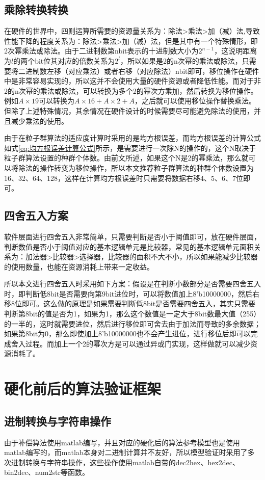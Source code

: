 \subsection{乘除转换转换}
在硬件的世界中，四则运算所需要的资源量关系为：除法>乘法>加（减）法,导致性能下降的程度关系为：除法>乘法>加（减）法，但是其中有一个特殊情形，即2次幂乘法或除法。由于二进制数第nbit表示的十进制数大小为$2^{n-1}$，这说明距离为$l$的两个bit位其对应的倍数关系为$2^{l}$，所以如果是2的n次幂的乘法或除法，只需要将二进制数左移（对应乘法）或者右移（对应除法）nbit即可，移位操作在硬件中是非常容易实现的，所以这并不会使用大量的硬件资源或者降低性能。而对于非2的n次幂的乘法或除法，可以转换为多个2的幂次方乘加，然后转换为移位操作。例如$A\times 19$可以转换为$A\times 16 +A\times 2+A$，之后就可以使用移位操作替换乘法。但除了上述特殊情况，其余情况在硬件设计的时候需要尽可能避免除法的使用，并且减少乘法的使用。

由于在粒子群算法的适应度计算时采用的是均方根误差，而均方根误差的计算公式如式\eqref{eq:均方根误差计算公式}所示，是需要进行一次除N的操作的，这个N取决于粒子群算法设置的种群个体数。由前文所述，如果这个N是2的幂乘法，那么就可以将除法的操作转变为移位操作，所以本文推荐粒子群算法的种群个体数设置为16、32、64、128，这样在计算均方根误差时只需要将数据右移4、5、6、7位即可。

\subsection{四舍五入方案}
软件层面进行四舍五入非常简单，只需要判断是否小于阈值即可，放在硬件层面，判断数值是否小于阈值对应的基本逻辑单元是比较器，常见的基本逻辑单元面积关系为：加法器>比较器>选择器，比较器的面积不大不小，所以如果能减少比较器的使用数量，也能在资源消耗上带来一定收益。

所以本文进行四舍五入时采用如下方案：假设是在判断小数部分是否需要四舍五入时，即判断低8bit是否需要向第9bit进位时，可以将数值加上8'b10000000，然后右移8位即可。这么做的原理是如果需要判断低8bit是否需要四舍五入，其实只需要判断第8bit的值是否为1，如果为1，那么这个数值是一定大于8bit数最大值（255）的一半的，这时就需要进位，然后进行移位即可舍去由于加法而导致的多余数据；如果第8bit为0，那么即使加上8'b10000000也不会产生进位，进行移位后即可以完成舍入过程。而加上一个2的幂次方是可以通过异或门实现，这样做就可以减少资源消耗了。

\section{硬化前后的算法验证框架}
\subsection{进制转换与字符串操作}
由于补偿算法使用matlab编写，并且对应的硬化后的算法参考模型也是使用matlab编写的，而matlab本身对二进制计算并不友好，所以模型验证时采用了多次进制转换与字符串操作，这些操作使用matlab自带的dec2hex、hex2dec、bin2dec、num2str等函数。

